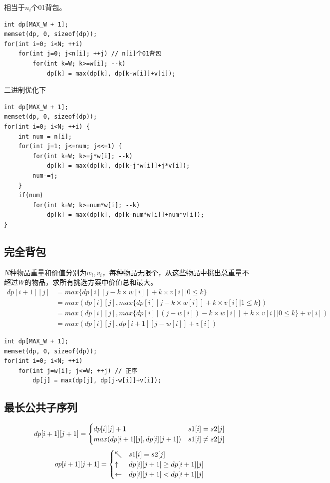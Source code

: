 \documentclass[a4paper]{ctexrep}
\begin{document}
相当于$n_i$个01背包。
\begin{lstlisting}
int dp[MAX_W + 1];
memset(dp, 0, sizeof(dp));
for(int i=0; i<N; ++i)
	for(int j=0; j<n[i]; ++j) // n[i]个01背包
		for(int k=W; k>=w[i]; --k)
			dp[k] = max(dp[k], dp[k-w[i]]+v[i]);
\end{lstlisting}

二进制优化下
\begin{lstlisting}
int dp[MAX_W + 1];
memset(dp, 0, sizeof(dp));
for(int i=0; i<N; ++i) {
	int num = n[i];
	for(int j=1; j<=num; j<<=1) {
		for(int k=W; k>=j*w[i]; --k)
			dp[k] = max(dp[k], dp[k-j*w[i]]+j*v[i]);
		num-=j;
	}
	if(num)
		for(int k=W; k>=num*w[i]; --k)
			dp[k] = max(dp[k], dp[k-num*w[i]]+num*v[i]);
}
\end{lstlisting}

\subsection{完全背包}
$N$种物品重量和价值分别为$w_i, v_i$，每种物品无限个，从这些物品中挑出总重量不超过$W$的物品，求所有挑选方案中价值总和最大。
$$
\begin{aligned}
dp[i+1][j] &= max\{dp[i][j-k\times w[i]]+k \times v[i] | 0 \leq k\} \\
&=max(dp[i][j], max\{dp[i][j-k\times w[i]]+k \times v[i] | 1 \leq k\}) \\
&=max(dp[i][j], max\{dp[i][(j-w[i])-k\times w[i]] + k\times v[i]|0\leq k\} + v[i]) \\
&=max(dp[i][j], dp[i+1][j-w[i]]+v[i]) 
\end{aligned}$$

\begin{lstlisting}
int dp[MAX_W + 1];
memset(dp, 0, sizeof(dp));
for(int i=0; i<N; ++i)
	for(int j=w[i]; j<=W; ++j) // 正序
		dp[j] = max(dp[j], dp[j-w[i]]+v[i]);
\end{lstlisting}


\subsection{最长公共子序列}
$$
dp[i+1][j+1]=\begin{cases}
	dp[i][j]+1 & s1[i]=s2[j] \cr
	max(dp[i+1][j], dp[i][j+1]) & s1[i] \neq s2[j]
\end{cases}
$$
$$
op[i+1][j+1]=\begin{cases}
	\nwarrow & s1[i]=s2[j] \cr
	\uparrow & dp[i][j+1] \geq dp[i+1][j] \cr
	\leftarrow & dp[i][j+1] < dp[i+1][j] \cr
\end{cases}
$$
\end{document}
